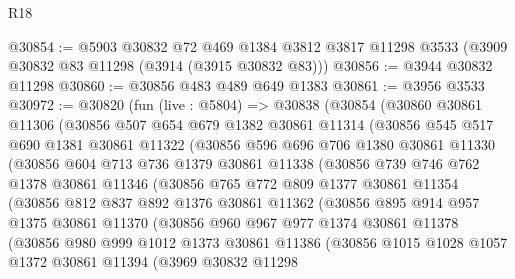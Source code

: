 \begin{lexlean}{R18}
\begin{coremodule}
@30854 := @5903
    @30832
    @72
    @469
    @1384
    @3812
    @3817
    @11298
    @3533
    (@3909 @30832 @83 @11298 (@3914 (@3915 @30832 @83)))
@30856 := @3944 @30832 @11298
@30860 := @30856 @483 @489 @649 @1383
@30861 := @3956 @3533
@30972 := @30820
    (fun (live : @5804) =>
    @30838
      (@30854
        (@30860
          @30861
          @11306
          (@30856
            @507
            @654
            @679
            @1382
            @30861
            @11314
            (@30856
              @545
              @517
              @690
              @1381
              @30861
              @11322
              (@30856
                @596
                @696
                @706
                @1380
                @30861
                @11330
                (@30856
                  @604
                  @713
                  @736
                  @1379
                  @30861
                  @11338
                  (@30856
                    @739
                    @746
                    @762
                    @1378
                    @30861
                    @11346
                    (@30856
                      @765
                      @772
                      @809
                      @1377
                      @30861
                      @11354
                      (@30856
                        @812
                        @837
                        @892
                        @1376
                        @30861
                        @11362
                        (@30856
                          @895
                          @914
                          @957
                          @1375
                          @30861
                          @11370
                          (@30856
                            @960
                            @967
                            @977
                            @1374
                            @30861
                            @11378
                            (@30856
                              @980
                              @999
                              @1012
                              @1373
                              @30861
                              @11386
                              (@30856
                                @1015
                                @1028
                                @1057
                                @1372
                                @30861
                                @11394
                                (@3969
                                  @30832
                                  @11298

\end{coremodule}
\end{lexlean}
